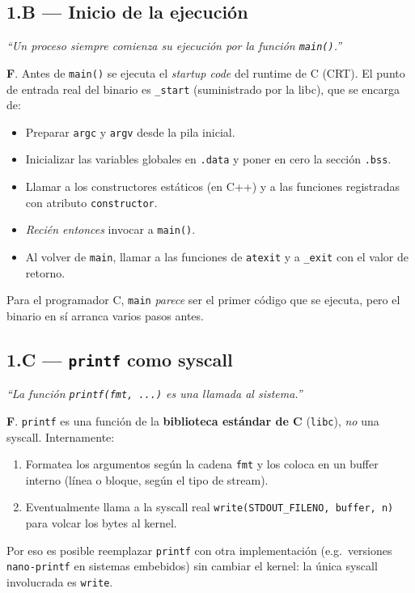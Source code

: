 \documentclass[11pt,a4paper]{article}
\begin{document}
\subsection*{1.B --- Inicio de la ejecución}

\emph{``Un proceso siempre comienza su ejecución por la función
\texttt{main()}.''}

\begin{respuesta}
\textbf{F}. Antes de \texttt{main()} se ejecuta el \emph{startup code}
del runtime de C (CRT). El punto de entrada real del binario es
\texttt{\_start} (suministrado por la libc), que se encarga de:

\begin{itemize}[leftmargin=*,nosep]
    \item Preparar \texttt{argc} y \texttt{argv} desde la pila inicial.
    \item Inicializar las variables globales en \texttt{.data} y
        poner en cero la sección \texttt{.bss}.
    \item Llamar a los constructores estáticos (en C++) y a las
        funciones registradas con atributo \texttt{constructor}.
    \item \emph{Recién entonces} invocar a \texttt{main()}.
    \item Al volver de \texttt{main}, llamar a las funciones de
        \texttt{atexit} y a \texttt{\_exit} con el valor de retorno.
\end{itemize}

Para el programador C, \texttt{main} \emph{parece} ser el primer
código que se ejecuta, pero el binario en sí arranca varios pasos
antes.
\end{respuesta}

\subsection*{1.C --- \texttt{printf} como syscall}

\emph{``La función \texttt{printf(fmt, ...)} es una llamada al
sistema.''}

\begin{respuesta}
\textbf{F}. \texttt{printf} es una función de la \textbf{biblioteca
estándar de C} (\texttt{libc}), \emph{no} una syscall.
Internamente:

\begin{enumerate}[leftmargin=*,nosep]
    \item Formatea los argumentos según la cadena \texttt{fmt} y los
        coloca en un buffer interno (línea o bloque, según el tipo
        de stream).
    \item Eventualmente llama a la syscall real
        \texttt{write(STDOUT\_FILENO, buffer, n)} para volcar los
        bytes al kernel.
\end{enumerate}

Por eso es posible reemplazar \texttt{printf} con otra
implementación (e.g.\ versiones \texttt{nano-printf} en sistemas
embebidos) sin cambiar el kernel: la única syscall involucrada es
\texttt{write}.
\end{respuesta}
\end{document}
